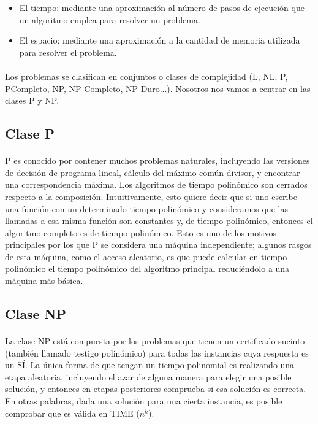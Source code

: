 \documentclass[11pt, a4paper,spanish]{article}
\begin{document}
			\begin{itemize}
			
				\item El tiempo: mediante una aproximación al número de pasos de ejecución que un algoritmo emplea para resolver un problema.
			
				\item El espacio: mediante una aproximación a la cantidad de memoria utilizada para resolver el problema.

			\end{itemize}
			
			\paragraph{}
			Los problemas se clasifican en conjuntos o clases de complejidad (L, NL, P, PCompleto, NP, NP-Completo, NP Duro...). Nosotros nos vamos a centrar en las clases P y NP.

			\subsection{Clase P}
			
				\paragraph{}
				P es conocido por contener muchos problemas naturales, incluyendo las versiones de decisión de programa lineal, cálculo del máximo común divisor, y encontrar una correspondencia máxima. Los algoritmos de tiempo polinómico son cerrados respecto a la composición. Intuitivamente, esto quiere decir que si uno escribe una función con un determinado tiempo polinómico y consideramos que las llamadas a esa misma función son constantes y, de tiempo polinómico, entonces el algoritmo completo es de tiempo polinómico. Esto es uno de los motivos principales por los que P se considera una máquina independiente; algunos rasgos de esta máquina, como el acceso aleatorio, es que puede calcular en tiempo polinómico el tiempo polinómico del algoritmo principal reduciéndolo a una máquina más básica.
			
			\subsection{Clase NP}
				\paragraph{}
				La clase NP está compuesta por los problemas que tienen un certificado sucinto (también llamado testigo polinómico) para todas las instancias cuya respuesta es un SÍ. La única forma de que tengan un tiempo polinomial es realizando una etapa aleatoria, incluyendo el azar de alguna manera para elegir una posible solución, y entonces en etapas posteriores comprueba si esa solución es correcta. En otras palabras, dada una solución para una cierta instancia, es posible comprobar que es válida en TIME ($n^k$).
\end{document}
